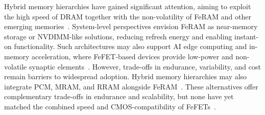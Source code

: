 Hybrid memory hierarchies have gained significant attention, aiming to exploit the high speed of DRAM together with the non-volatility of FeRAM and other emerging memories~\cite{itrs2022, samsung2021}. 
System-level perspectives envision FeRAM as near-memory storage or NVDIMM-like solutions, reducing refresh energy and enabling instant-on functionality. 
Such architectures may also support AI edge computing and in-memory acceleration, where FeFET-based devices provide low-power and non-volatile synaptic elements~\cite{schaller2021_ai}. 
However, trade-offs in endurance, variability, and cost remain barriers to widespread adoption.
Hybrid memory hierarchies may also integrate PCM, MRAM, and RRAM alongside FeRAM~\cite{itrs2022, samsung2021}. 
These alternatives offer complementary trade-offs in endurance and scalability, 
but none have yet matched the combined speed and CMOS-compatibility of FeFETs~\cite{schaller2021_ai}.
